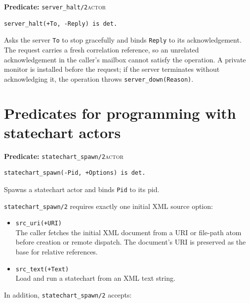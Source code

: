 \noindent \textbf{Predicate:} \texttt{server\_\allowbreak{}halt/\allowbreak{}2}\hfill\textsc{actor}

\begin{verbatim}
server_halt(+To, -Reply) is det.
\end{verbatim}

\noindent Asks the server \texttt{To} to stop gracefully and binds
\texttt{Reply} to its acknowledgement. The request carries a fresh
correlation reference, so an unrelated acknowledgement in the caller's
mailbox cannot satisfy the operation. A private monitor is installed before
the request; if the server terminates without acknowledging it, the operation
throws \texttt{server\_\allowbreak{}down(\allowbreak{}Reason)}.\\


\section{Predicates for programming with statechart actors}\label{sec:statechart-api}


\noindent \textbf{Predicate:} \texttt{statechart\_\allowbreak{}spawn/\allowbreak{}2}\hfill\textsc{actor}

\begin{verbatim}
statechart_spawn(-Pid, +Options) is det.
\end{verbatim}

\noindent Spawns a statechart actor and binds \texttt{Pid} to its pid.

\medskip
\noindent \texttt{statechart\_\allowbreak{}spawn/\allowbreak{}2} requires exactly one
initial XML source option:

\begin{itemize}
\item
  \texttt{src\_\allowbreak{}uri(\allowbreak{}+URI)}\\
  The caller fetches the initial XML document from a URI or file-path atom
  before creation or remote dispatch. The document's URI is preserved as the
  base for relative references.
\item
  \texttt{src\_\allowbreak{}text(\allowbreak{}+Text)}\\
  Load and run a statechart from an XML text string.
\end{itemize}

\noindent In addition, \texttt{statechart\_\allowbreak{}spawn/\allowbreak{}2} accepts:

